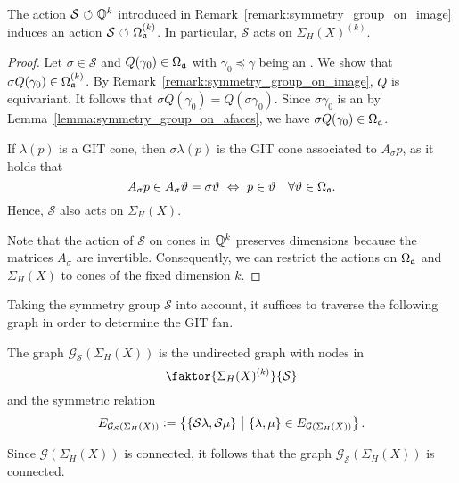 \begin{prop}
	\label{proposition:symmetry_group_on_orbit_cones}
	The action $\mathcal{S}{\ \circlearrowleft\ }\mathbb{Q}^k$ introduced in Remark~\ref{remark:symmetry_group_on_image} induces an action $\mathcal{S}{\ \circlearrowleft\ }\Omega_{\mathfrak{a}}^{(k)}$. In particular, $\mathcal{S}$ acts on $\Sigma_H(X)^{(k)}$.
\end{prop}
\begin{proof}
	Let $\sigma\in\mathcal{S}$ and $Q(\gamma_0)\in\Omega_{\mathfrak{a}}$ with $\gamma_0\preceq\gamma$ being an \aface{}. We show that $\sigma Q(\gamma_0)\in\Omega_{\mathfrak{a}}^{(k)}$. By Remark~\ref{remark:symmetry_group_on_image}, $Q$ is equivariant. It follows that $\sigma Q(\gamma_0) = Q(\sigma\gamma_0)$. Since $\sigma\gamma_0$ is an \aface{} by Lemma~\ref{lemma:symmetry_group_on_afaces}, we have $\sigma Q(\gamma_0)\in\Omega_{\mathfrak{a}}$.
	
	If $\lambda(p)$ is a GIT cone, then $\sigma \lambda(p)$ is the GIT cone associated to $A_\sigma p$, as it holds that
	$$A_\sigma p \in A_\sigma \vartheta = \sigma \vartheta \ \Leftrightarrow\ p\in \vartheta\quad \forall \vartheta\in\Omega_{\mathfrak{a}}.$$
	Hence, $\mathcal{S}$ also acts on $\Sigma_H(X)$.
	
	Note that the action of $\mathcal{S}$ on cones in $\mathbb{Q}^k$ preserves dimensions because the matrices $A_\sigma$ are invertible. Consequently, we can restrict the actions on $\Omega_{\mathfrak{a}}$ and $\Sigma_H(X)$ to cones of the fixed dimension $k$.
\end{proof}

Taking the symmetry group $\mathcal{S}$ into account, it suffices to traverse the following graph in order to determine the GIT fan.

\begin{defi}
	The graph $\mathcal{G}_\mathcal{S}(\Sigma_H(X))$ is the undirected graph with nodes in
	$$\faktor{\Sigma_H(X)^{(k)}}{\mathcal{S}}$$ 
	and the symmetric relation
	$$E_{\mathcal{G}_\mathcal{S}(\Sigma_H(X))} \mathrel{\mathop:}= \left\{\{\mathcal{S}\lambda, \mathcal{S}\mu\}\ \middle|\ \{\lambda, \mu\} \in  E_{\mathcal{G}(\Sigma_H(X))}\right\}.$$
\end{defi}

\begin{remark}
	Since $\mathcal{G}(\Sigma_H(X))$ is connected, it follows that the graph $\mathcal{G}_\mathcal{S}(\Sigma_H(X))$ is connected.
\end{remark}


